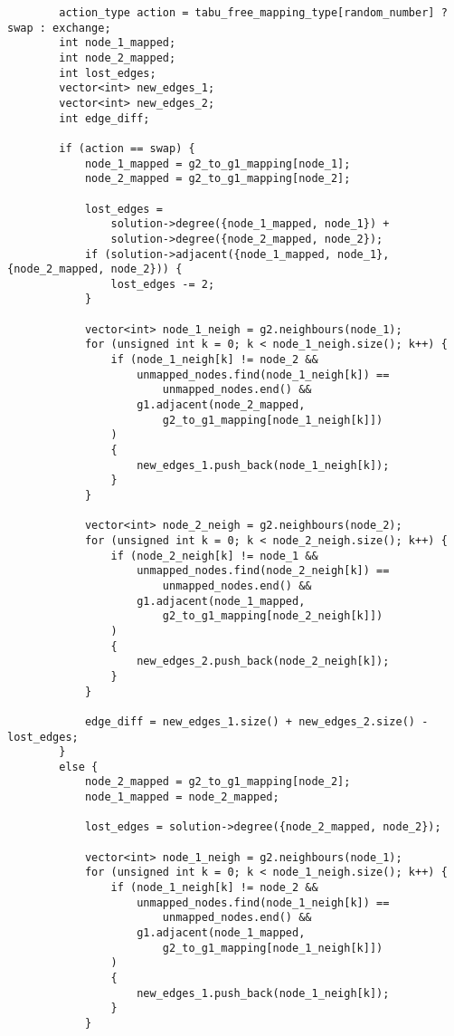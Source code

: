 \begin{lstlisting}
        action_type action = tabu_free_mapping_type[random_number] ? swap : exchange;
        int node_1_mapped;
        int node_2_mapped;
        int lost_edges;
        vector<int> new_edges_1;
        vector<int> new_edges_2;
        int edge_diff;

        if (action == swap) {
            node_1_mapped = g2_to_g1_mapping[node_1];
            node_2_mapped = g2_to_g1_mapping[node_2];

            lost_edges =
                solution->degree({node_1_mapped, node_1}) +
                solution->degree({node_2_mapped, node_2});
            if (solution->adjacent({node_1_mapped, node_1}, {node_2_mapped, node_2})) {
                lost_edges -= 2;
            }

            vector<int> node_1_neigh = g2.neighbours(node_1);
            for (unsigned int k = 0; k < node_1_neigh.size(); k++) {
                if (node_1_neigh[k] != node_2 &&
                    unmapped_nodes.find(node_1_neigh[k]) ==
                        unmapped_nodes.end() &&
                    g1.adjacent(node_2_mapped,
                        g2_to_g1_mapping[node_1_neigh[k]])
                )
                {
                    new_edges_1.push_back(node_1_neigh[k]);
                }
            }

            vector<int> node_2_neigh = g2.neighbours(node_2);
            for (unsigned int k = 0; k < node_2_neigh.size(); k++) {
                if (node_2_neigh[k] != node_1 &&
                    unmapped_nodes.find(node_2_neigh[k]) ==
                        unmapped_nodes.end() &&
                    g1.adjacent(node_1_mapped,
                        g2_to_g1_mapping[node_2_neigh[k]])
                )
                {
                    new_edges_2.push_back(node_2_neigh[k]);
                }
            }

            edge_diff = new_edges_1.size() + new_edges_2.size() - lost_edges;
        }
        else {
            node_2_mapped = g2_to_g1_mapping[node_2];
            node_1_mapped = node_2_mapped;

            lost_edges = solution->degree({node_2_mapped, node_2});

            vector<int> node_1_neigh = g2.neighbours(node_1);
            for (unsigned int k = 0; k < node_1_neigh.size(); k++) {
                if (node_1_neigh[k] != node_2 &&
                    unmapped_nodes.find(node_1_neigh[k]) ==
                        unmapped_nodes.end() &&
                    g1.adjacent(node_1_mapped,
                        g2_to_g1_mapping[node_1_neigh[k]])
                )
                {
                    new_edges_1.push_back(node_1_neigh[k]);
                }
            }


\end{lstlisting}
